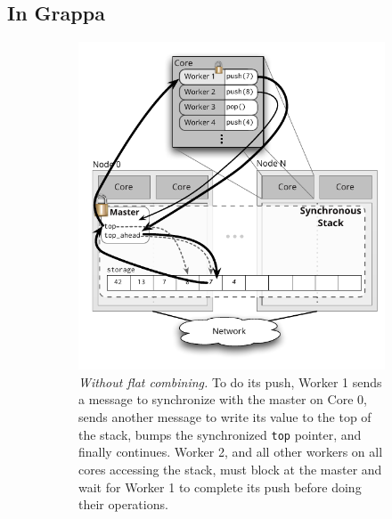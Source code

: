 \subsection{In Grappa}

\begin{figure}[t]
  \centering
  \begin{subfigure}[b]{0.43\textwidth}
    \includegraphics[width=\textwidth]{figs/stack_nofc.pdf}
    \caption{\emph{Without flat combining.}
      To do its push, Worker 1 sends a message to synchronize with the master on Core 0, sends another message to write its value to the top of the stack, bumps the synchronized \texttt{top} pointer, and finally continues. Worker 2, and all other workers on all cores accessing the stack, must block at the master and wait for Worker 1 to complete its push before doing their operations.
    }
    \label{fig:stacknofc}
  \end{subfigure}%
  \hspace{0.05\textwidth}
  \begin{subfigure}[b]{0.43\textwidth}
    \centering

\end{subfigure}
\end{figure}
